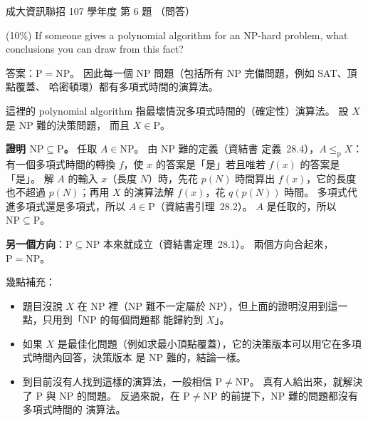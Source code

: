 \begin{pastexam}[label={px:ncku-107-prog-06}]{成大資訊聯招 107 學年度 第 6 題}
（問答）

(10\%) If someone gives a polynomial algorithm for an NP-hard problem, what conclusions you can
draw from this fact?
\end{pastexam}

\begin{pastsoln}
答案：$\mathrm{P} = \mathrm{NP}$。 因此每一個 NP 問題（包括所有 NP 完備問題，例如 SAT、頂點覆蓋、
哈密頓環）都有多項式時間的演算法。

這裡的 polynomial algorithm 指最壞情況多項式時間的（確定性）演算法。 設 $X$ 是 NP 難的決策問題，
而且 $X \in \mathrm{P}$。

\textbf{證明 $\mathrm{NP} \subseteq \mathrm{P}$。} 任取 $A \in \mathrm{NP}$。 由 NP 難的定義（資結書
定義~28.4），$A \le_{\mathrm{p}} X$：有一個多項式時間的轉換 $f$，使 $x$ 的答案是「是」若且唯若 $f(x)$
的答案是「是」。 解 $A$ 的輸入 $x$（長度 $N$）時，先花 $p(N)$ 時間算出 $f(x)$，它的長度也不超過
$p(N)$；再用 $X$ 的演算法解 $f(x)$，花 $q(p(N))$ 時間。 多項式代進多項式還是多項式，所以
$A \in \mathrm{P}$（資結書引理~28.2）。 $A$ 是任取的，所以 $\mathrm{NP} \subseteq \mathrm{P}$。

\textbf{另一個方向}：$\mathrm{P} \subseteq \mathrm{NP}$ 本來就成立（資結書定理~28.1）。 兩個方向合起來，
$\mathrm{P} = \mathrm{NP}$。

幾點補充：
\begin{itemize}
\item 題目沒說 $X$ 在 NP 裡（NP 難不一定屬於 NP），但上面的證明沒用到這一點，只用到「NP 的每個問題都
能歸約到 $X$」。
\item 如果 $X$ 是最佳化問題（例如求最小頂點覆蓋），它的決策版本可以用它在多項式時間內回答，決策版本
是 NP 難的，結論一樣。
\item 到目前沒有人找到這樣的演算法，一般相信 $\mathrm{P} \ne \mathrm{NP}$。 真有人給出來，就解決了
P 與 NP 的問題。 反過來說，在 $\mathrm{P} \ne \mathrm{NP}$ 的前提下，NP 難的問題都沒有多項式時間的
演算法。
\end{itemize}
\end{pastsoln}
